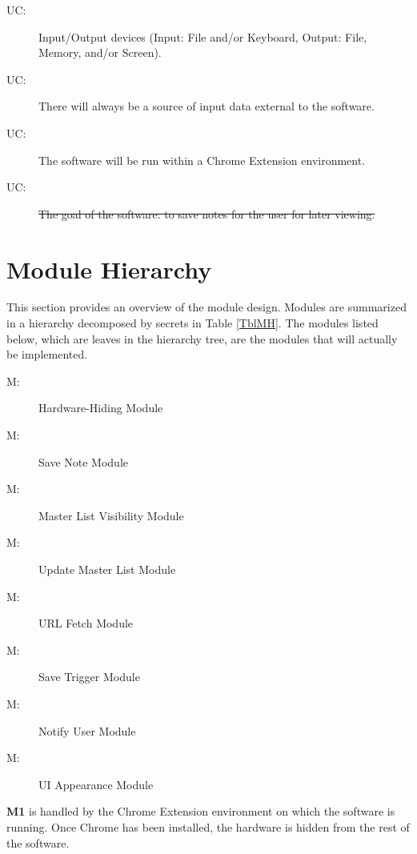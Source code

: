\documentclass[12pt, titlepage]{article}
\newcounter{ucnum}
\newcommand{\uctheucnum}{UC\theucnum}
\newcounter{mnum}
\newcommand{\mthemnum}{M\themnum}
\begin{document}
\begin{description}
\item[ \uctheucnum \label{ucIO}:] Input/Output devices
  (Input: File and/or Keyboard, Output: File, Memory, and/or Screen).
\item[ \uctheucnum \label{ucInput}:] There will always be
  a source of input data external to the software.
\item[ \uctheucnum \label{ucChrome}:] The software will 
  be run within a Chrome Extension environment.
  
\item[ \uctheucnum \label{ucGoal}:] \sout{The goal of the 
	software: to save notes for the user for later viewing. }
\end{description}

\section{Module Hierarchy} \label{SecMH}

This section provides an overview of the module design. Modules are summarized
in a hierarchy decomposed by secrets in Table \ref{TblMH}. The modules listed
below, which are leaves in the hierarchy tree, are the modules that will
actually be implemented.

\begin{description}
\item [ \mthemnum \label{mHH}:] Hardware-Hiding Module
\item [ \mthemnum \label{mSave}:] Save Note Module
\item [ \mthemnum \label{mVisibility}:] Master List 
Visibility Module
\item [ \mthemnum \label{mUpdate}:] Update Master List 
Module
\item [ \mthemnum \label{mURL}:] URL Fetch Module
\item [ \mthemnum \label{mTrigger}:] Save Trigger Module
\item [ \mthemnum \label{mNotify}:] Notify User Module
\item [ \mthemnum \label{mUI}:] UI Appearance Module
\end{description}

\textbf{M1} is handled by the Chrome Extension environment on which the 
software is running. Once Chrome has been installed, the hardware is hidden 
from the rest of the software.\\
\end{document}
